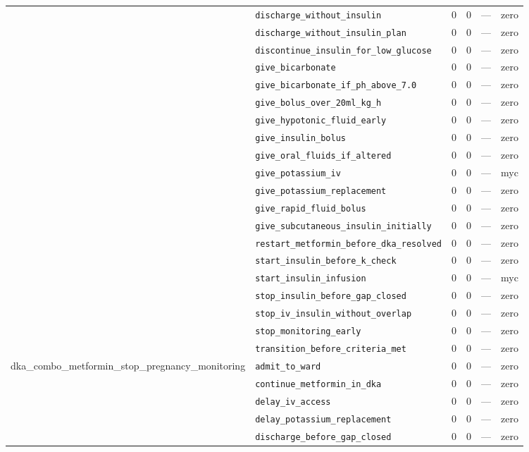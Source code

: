 \begin{table}[ht]
\begin{tabular}{llrrrl}
 & \texttt{discharge\_without\_insulin} & 0 & 0 & — & zero \\
 & \texttt{discharge\_without\_insulin\_plan} & 0 & 0 & — & zero \\
 & \texttt{discontinue\_insulin\_for\_low\_glucose} & 0 & 0 & — & zero \\
 & \texttt{give\_bicarbonate} & 0 & 0 & — & zero \\
 & \texttt{give\_bicarbonate\_if\_ph\_above\_7.0} & 0 & 0 & — & zero \\
 & \texttt{give\_bolus\_over\_20ml\_kg\_h} & 0 & 0 & — & zero \\
 & \texttt{give\_hypotonic\_fluid\_early} & 0 & 0 & — & zero \\
 & \texttt{give\_insulin\_bolus} & 0 & 0 & — & zero \\
 & \texttt{give\_oral\_fluids\_if\_altered} & 0 & 0 & — & zero \\
 & \texttt{give\_potassium\_iv} & 0 & 0 & — & myc \\
 & \texttt{give\_potassium\_replacement} & 0 & 0 & — & zero \\
 & \texttt{give\_rapid\_fluid\_bolus} & 0 & 0 & — & zero \\
 & \texttt{give\_subcutaneous\_insulin\_initially} & 0 & 0 & — & zero \\
 & \texttt{restart\_metformin\_before\_dka\_resolved} & 0 & 0 & — & zero \\
 & \texttt{start\_insulin\_before\_k\_check} & 0 & 0 & — & zero \\
 & \texttt{start\_insulin\_infusion} & 0 & 0 & — & myc \\
 & \texttt{stop\_insulin\_before\_gap\_closed} & 0 & 0 & — & zero \\
 & \texttt{stop\_iv\_insulin\_without\_overlap} & 0 & 0 & — & zero \\
 & \texttt{stop\_monitoring\_early} & 0 & 0 & — & zero \\
 & \texttt{transition\_before\_criteria\_met} & 0 & 0 & — & zero \\
\midrule
dka\_combo\_metformin\_stop\_pregnancy\_monitoring & \texttt{admit\_to\_ward} & 0 & 0 & — & zero \\
 & \texttt{continue\_metformin\_in\_dka} & 0 & 0 & — & zero \\
 & \texttt{delay\_iv\_access} & 0 & 0 & — & zero \\
 & \texttt{delay\_potassium\_replacement} & 0 & 0 & — & zero \\
 & \texttt{discharge\_before\_gap\_closed} & 0 & 0 & — & zero \\

\end{tabular}
\end{table}
